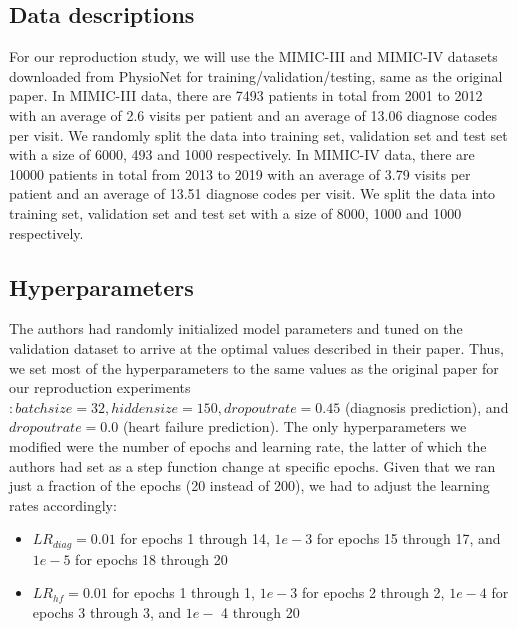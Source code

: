\documentclass[11pt,a4paper,fleqn]{article}
\begin{document}
\subsection{Data descriptions}
For our reproduction study, we will use the MIMIC-III \cite{mimic3} and
MIMIC-IV \cite{mimic4} datasets downloaded from PhysioNet \cite{physionet} for
training/validation/testing, same as the original paper. In MIMIC-III data,
there are 7493 patients in total from 2001 to 2012 with an average of 2.6 visits
per patient and an average of 13.06 diagnose codes per visit. We randomly split
the data into training set, validation set and test set with a size of 6000, 493
and 1000 respectively. In MIMIC-IV data, there are 10000 patients in total from
2013 to 2019 with an average of 3.79 visits per patient and an average of 13.51
diagnose codes per visit. We split the data into training set, validation set
and test set with a size of 8000, 1000 and 1000 respectively. 

\subsection{Hyperparameters}
The authors had randomly initialized model parameters and tuned on the
validation dataset to arrive at the optimal values described in their paper.
Thus, we set most of the hyperparameters to the same values as the original 
paper for our reproduction experiments$: batch size = 32, hidden size = 150,
dropout rate = 0.45$ (diagnosis prediction), and $dropout rate = 0.0$ (heart
failure prediction). The only hyperparameters we modified were the number of
epochs and learning rate, the latter of which the authors had set as a step
function change at specific epochs. Given that we ran just a fraction of the
epochs (20 instead of 200), we had to adjust the learning rates accordingly: 
\begin{itemize}
  \item $LR_{diag} = 0.01$ for epochs 1 through 14,
  $1e-3$ for epochs 15 through 17, and $1e-5$ for epochs 18 through 20
  \item $LR_{hf} = 0.01$ for epochs 1 through
  1, $1e-3$ for epochs 2 through 2, $1e-4$ for epochs 3 through 3, and $1e-$ 4
  through 20
\end{itemize}
\end{document}
